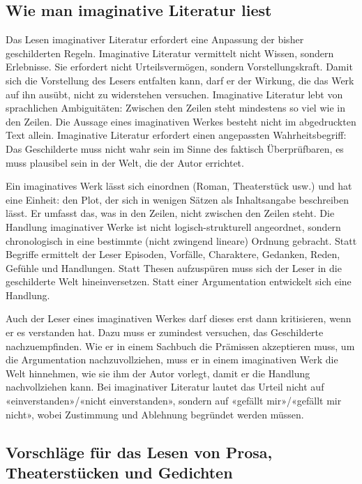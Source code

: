 \documentclass[a4paper,11pt]{scrartcl}
\begin{document}
\subsection{Wie man imaginative Literatur liest}

Das Lesen imaginativer Literatur erfordert eine Anpassung der bisher geschilderten Regeln. Imaginative Literatur vermittelt nicht Wissen, sondern Erlebnisse. Sie erfordert nicht Urteilsvermögen, sondern Vorstellungskraft. Damit sich die Vorstellung des Lesers entfalten kann, darf er der Wirkung, die das Werk auf ihn ausübt, nicht zu widerstehen versuchen. Imaginative Literatur lebt von sprachlichen Ambiguitäten: Zwischen den Zeilen steht mindestens so viel wie in den Zeilen. Die Aussage eines imaginativen Werkes besteht nicht im abgedruckten Text allein. Imaginative Literatur erfordert einen angepassten Wahrheitsbegriff: Das Geschilderte muss nicht wahr sein im Sinne des faktisch Überprüfbaren, es muss plausibel sein in der Welt, die der Autor errichtet.

Ein imaginatives Werk lässt sich einordnen (Roman, Theaterstück usw.) und hat eine Einheit: den Plot, der sich in wenigen Sätzen als Inhaltsangabe beschreiben lässt. Er umfasst das, was in den Zeilen, nicht zwischen den Zeilen steht. Die Handlung imaginativer Werke ist nicht logisch-strukturell angeordnet, sondern chronologisch in eine bestimmte (nicht zwingend lineare) Ordnung gebracht. Statt Begriffe ermittelt der Leser Episoden, Vorfälle, Charaktere, Gedanken, Reden, Gefühle und Handlungen. Statt Thesen aufzuspüren muss sich der Leser in die geschilderte Welt hineinversetzen. Statt einer Argumentation entwickelt sich eine Handlung.

Auch der Leser eines imaginativen Werkes darf dieses erst dann kritisieren, wenn er es verstanden hat. Dazu muss er zumindest versuchen, das Geschilderte nachzuempfinden. Wie er in einem Sachbuch die Prämissen akzeptieren muss, um die Argumentation nachzuvollziehen, muss er in einem imaginativen Werk die Welt hinnehmen, wie sie ihm der Autor vorlegt, damit er die Handlung nachvollziehen kann. Bei imaginativer Literatur lautet das Urteil nicht auf «einverstanden»/«nicht einverstanden», sondern auf «gefällt mir»/«gefällt mir nicht», wobei Zustimmung und Ablehnung begründet werden müssen.

\subsection{Vorschläge für das Lesen von Prosa, Theaterstücken und Gedichten}
\end{document}
